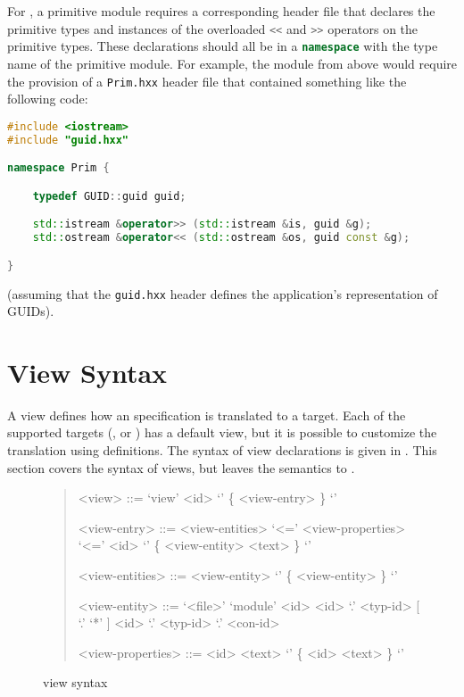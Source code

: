 For \Cplusplus{}, a primitive module requires a corresponding header file that declares
the primitive types and instances of the overloaded \lstinline[language=c++]!<<! and
\lstinline[language=c++]!>>! operators on the primitive types.  These declarations should
all be in a \lstinline[language=c++]!namespace! with the type name of the primitive module.
For example, the module from above would require the provision of a \texttt{Prim.hxx} header
file that contained something like the following code:
%
\begin{code}\begin{lstlisting}[language=c++]
#include <iostream>
#include "guid.hxx"

namespace Prim {

    typedef GUID::guid guid;

    std::istream &operator>> (std::istream &is, guid &g);
    std::ostream &operator<< (std::ostream &os, guid const &g);

}
\end{lstlisting}\end{code}%
(assuming that the \texttt{guid.hxx} header defines the application's representation
of GUIDs).


\section{View Syntax}
\label{sec:view-syntax}

A view defines how an \asdl{} specification is translated to a target.
Each of the supported targets (\eg{}, \sml{} or \Cplusplus{}) has a default
view, but it is possible to customize the translation using 
definitions.
The syntax of view declarations is given in .
This section covers the syntax of views, but leaves the semantics to
.

\begin{figure}[t]
  \begin{quote}
    \begin{grammar}
      <view>        ::= `view' <id> `{' \{ <view-entry> \} `}'

      <view-entry>  ::=  <view-entities> `<=' <view-properties>
         \alt{} `<=' <id> `{' \{ <view-entity> <text> \} `}'

      <view-entities> ::= <view-entity>
         \alt{} `{' \{ <view-entity> \} `}'

      <view-entity> ::= `<file>'
         \alt{} `module' <id>
         \alt{} <id> `.' <typ-id> [ `.' `*' ]
         \alt{} <id> `.' <typ-id> `.' <con-id>

      <view-properties> ::= <id> <text>
          \alt{} `{' \{ <id> <text> \} `}'
    \end{grammar}%
  \end{quote}%
  \caption{\asdl{} view syntax}
  \label{fig:view-syntax}
\end{figure}%

